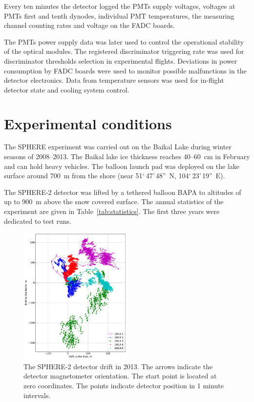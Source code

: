 \documentclass[universe,article,submit,moreauthors,pdftex]{Definitions/mdpi}
\begin{document}
Every ten minutes the detector logged the PMTs supply voltages, voltages at PMTs first and tenth dynodes, individual PMT temperatures, the measuring channel counting rates and voltage on the FADC boards.

The PMTs power supply data was later used to control the operational stability of the optical modules. The registered discriminator triggering rate was used for discriminator thresholds selection in experimental flights. Deviations in power consumption by FADC boards were used to monitor possible malfunctions in the detector electronics. Data from temperature sensors was used for in-flight detector state and cooling system control.




\section{Experimental conditions}
\label{sect:data}
 
The SPHERE experiment was carried out on the Baikal Lake during winter seasons of 2008--2013. The Baikal lake ice thickness reaches 40--60~cm in February and can hold heavy vehicles. The balloon launch pad was deployed on the lake surface around 700~m from the shore (near 51$^\circ$\,47'\,48''~N, 104$^\circ$\,23'\,19''~E).

The \mbox{SPHERE-2} detector was lifted by a tethered balloon BAPA to altitudes of up to 900~m above the snow covered surface. The annual statistics of the experiment are given in Table~\ref{tab:statistics}. The first three years were dedicated to test runs. 


\begin{figure}[tb]
    \includegraphics[width=0.5\textwidth]{figs/fig4_GPS_drift.pdf}\hspace{2pc}%
    \caption{The SPHERE-2 detector drift in 2013. The arrows indicate the detector magnetometer orientation. The start point is located at zero coordinates. The points indicate detector position in 1 minute intervals.}
\label{fig:gps_compass}
\end{figure}
\end{document}
